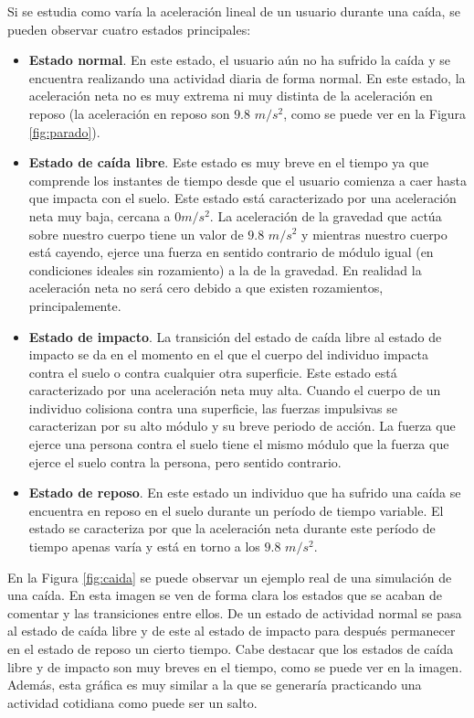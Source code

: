 Si se estudia como varía la aceleración lineal de un usuario durante una caída, se pueden observar cuatro estados principales:

\begin{itemize}
\item \textbf{Estado normal}. En este estado, el usuario aún no ha sufrido la caída y se encuentra realizando una actividad diaria de forma normal. En este estado, la aceleración neta no es muy extrema ni muy distinta de la aceleración en reposo (la aceleración en reposo son $9.8$ $m/s^2$, como se puede ver en la Figura \ref{fig:parado}).
\item \textbf{Estado de caída libre}. Este estado es muy breve en el tiempo ya que comprende los instantes de tiempo desde que el usuario comienza a caer hasta que impacta con el suelo. Este estado está caracterizado por una aceleración neta muy baja, cercana a $0 m/s^2$. La aceleración de la gravedad que actúa sobre nuestro cuerpo tiene un valor de $9.8$ $m/s^2$ y mientras nuestro cuerpo está cayendo, ejerce una fuerza en sentido contrario de módulo igual (en condiciones ideales sin rozamiento) a la de la gravedad. En realidad la aceleración neta no será cero debido a que existen rozamientos, principalemente.
\item \textbf{Estado de impacto}. La transición del estado de caída libre al estado de impacto se da en el momento en el que el cuerpo del individuo impacta contra el suelo o contra cualquier otra superficie. Este estado está caracterizado por una aceleración neta muy alta. Cuando el cuerpo de un individuo colisiona contra una superficie, las fuerzas impulsivas se caracterizan por su alto módulo y su breve periodo de acción. La fuerza que ejerce una persona contra el suelo tiene el mismo módulo que la fuerza que ejerce el suelo contra la persona, pero sentido contrario. 
\item \textbf{Estado de reposo}. En este estado un individuo que ha sufrido una caída se encuentra en reposo en el suelo durante un período de tiempo variable. El estado se caracteriza por que la aceleración neta durante este período de tiempo apenas varía y está en torno a los $9.8$ $m/s^2$.
\end{itemize}

En la Figura \ref{fig:caida} se puede observar un ejemplo real de una simulación de una caída. En esta imagen se ven de forma clara los estados que se acaban de comentar y las transiciones entre ellos. De un estado de actividad normal se pasa al estado de caída libre y de este al estado de impacto para después permanecer en el estado de reposo un cierto tiempo. Cabe destacar que los estados de caída libre y de impacto son muy breves en el tiempo, como se puede ver en la imagen. Además, esta gráfica es muy similar a la que se generaría practicando una actividad cotidiana como puede ser un salto. 

